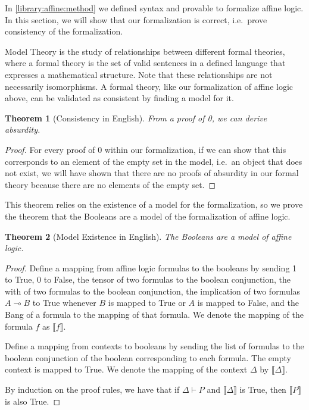 \documentclass{article}
\newtheorem{thm}{Theorem}
\theoremstyle{definition}
\begin{document}
In \autoref{library:affine:method} we defined syntax and provable to formalize affine logic. In this section, we will show that our formalization is correct, i.e.\ prove consistency of the formalization. 

Model Theory is the study of relationships between different formal theories, where a formal theory is the set of valid sentences in a defined language that expresses a mathematical structure. Note that these relationships are not necessarily isomorphisms. A formal theory, like our formalization of affine logic above, can be validated as consistent by finding a model for it. 

\setcounter{thmconsistency}{\value{thm}}
\begin{thm}[Consistency in English]
From a proof of 0, we can derive absurdity.
\end{thm}
\begin{proof}
For every proof of 0 within our formalization, if we can show that this corresponds to an element of the empty set in the model, i.e.\ an object that does not exist, we will have shown that there are no proofs of absurdity in our formal theory because there are no elements of the empty set. 
\end{proof}

This theorem relies on the existence of a model for the formalization, so we prove the theorem that the Booleans are a model of the formalization of affine logic. 

\setcounter{thmexistence}{\value{thm}}
\begin{thm}[Model Existence in English]
The Booleans are a model of affine logic. 
\end{thm}
\begin{proof}
Define a mapping from affine logic formulas to the booleans by sending 1 to True, 0 to False, the tensor of two formulas to the boolean conjunction, the with of two formulas to the boolean conjunction, the implication of two formulas $A \multimap B$ to True whenever $B$ is mapped to True or $A$ is mapped to False, and the Bang of a formula to the mapping of that formula. We denote the mapping of the formula $f$ as $\llbracket f\rrbracket$.

Define a mapping from contexts to booleans by sending the list of formulas to the boolean conjunction of the boolean corresponding to each formula. The empty context is mapped to True. We denote the mapping of the context $\Delta$ by $\llbracket\Delta\rrbracket$.

By induction on the proof rules, we have that if $\Delta \vdash P$ and $\llbracket\Delta\rrbracket$ is True, then $\llbracket P\rrbracket$ is also True.
\end{proof}
\end{document}
